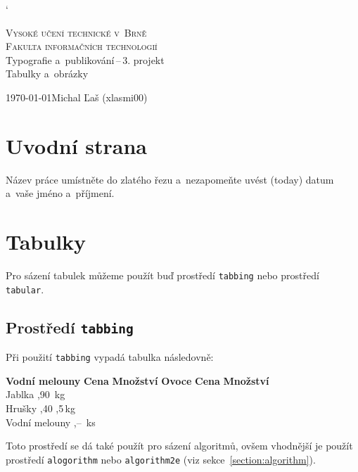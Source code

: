 \documentclass[a4paper, 11pt, a4paper]{article}
\begin{document}
\catcode`

\begin{titlepage}
    \begin{center}
            \textsc{\Huge Vysoké učení technické v~Brně \\}
            \vspace{0.5em}
            \textsc{\huge Fakulta informačních technologií \\}
            {\LARGE Typografie a~publikování\,--\,3. projekt \\ 
            \vspace{0.4em}
            \Huge Tabulky a~obrázky}
    \end{center}
    {\Large \today \hfill Michal Ľaš (xlasmi00)}
\end{titlepage}


\section{Uvodní strana}

Název práce umístněte do zlatého řezu a~nezapomeňte uvést  (today) datum a~vaše jméno a~příjmení.

\section{Tabulky}

Pro sázení tabulek můžeme použít buď prostředí \texttt{tabbing} nebo prostředí \texttt{tabular}.

\subsection{Prostředí \texttt{tabbing}}

Při použití \texttt{tabbing} vypadá tabulka následovně:
\begin{tabbing}
    \textbf{Vodní melouny} \quad \= \textbf{Cena} \quad \= \textbf{Množství} \kill
    \textbf{Ovoce} \> \textbf{Cena} \> \textbf{Množství} \\
    Jablka ,90 \,kg \\
    Hrušky ,40 ,5\,kg \\
    Vodní melouny ,-- \,ks \\
\end{tabbing}
Toto prostředí se dá také použít pro sázení algoritmů, ovšem vhodnější je použít prostředí \texttt{alogorithm} nebo \texttt{algorithm2e} (viz sekce~\ref{section:algorithm}).
\end{document}
